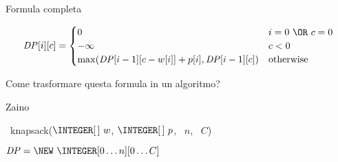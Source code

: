 \begin{frame}{Formula completa}

\begingroup
\small
\[
\mathit{DP}[i][c] = \begin{cases}
  0 & i=0\ \OR\ c=0 \\
  -\infty & c < 0 \\
  \max( \mathit{DP}[i-1][c-w[i]] + p[i], \mathit{DP}[i-1][c] ) & \textrm{otherwise}
\end{cases}
\]
\endgroup

Come trasformare questa formula in un algoritmo?

\end{frame}

\begin{frame}{Zaino}

\vspace{-9pt}
\begin{Procedure}
\caption[A]{\INTEGER\ \textsf{knapsack}($\INTEGER[\,]\ w$, $\INTEGER[\,]\ p$, \INTEGER\ $n$, \INTEGER\ $C$)}

$\mathit{DP} = \NEW\ \INTEGER[0 \ldots n][0 \ldots C]$\;
\;
\end{Procedure}

\end{frame}



